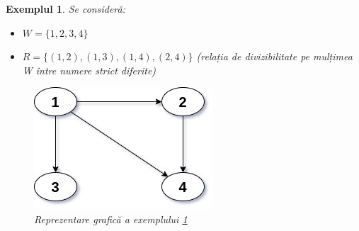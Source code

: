 \documentclass[12pt, openany]{book}
\newtheorem{example}[definition]{Exemplul} %
\begin{document}
            \begin{example}
            \label{ex_validity}
                Se consideră:

                \begin{itemize}
                    \item $W=\{1, 2, 3, 4\}$
                    \item $R=\{(1,2), (1,3), (1,4), (2,4)\}$ (relația de divizibilitate pe 
                    mulțimea W între numere strict diferite)
                \end{itemize}

                \begin{figure}[h!]
                    \label{fig_example_2}
                    \includegraphics[width=0.5\linewidth]{images/example_2.jpg}
                    \centering
                    \caption{Reprezentare grafică a exemplului \ref{ex_validity}}
                \end{figure}


\end{example}
\end{document}
